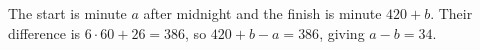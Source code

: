 The start is minute $a$ after midnight and the finish is minute $420+b$. Their difference is $6\cdot60+26=386$, so $420+b-a=386$, giving $\boxed{a-b=34}$.

